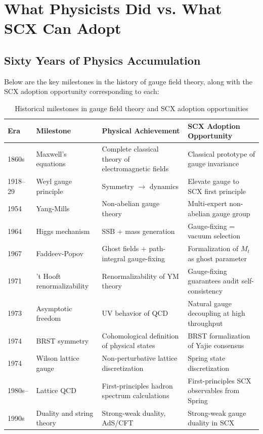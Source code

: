 \documentclass[12pt,a4paper]{article}
\theoremstyle{remark}
\begin{document}
\begin{longtable}{p{4.2cm} p{5cm} p{4cm} p{2cm}}
\bottomrule
\end{longtable}

\newpage

\section{What Physicists Did vs. What SCX Can Adopt}

\subsection{Sixty Years of Physics Accumulation}

Below are the key milestones in the history of gauge field theory, along with the SCX adoption opportunity corresponding to each:

\begin{table}[H]
\centering
\caption{Historical milestones in gauge field theory and SCX adoption opportunities}
\label{tab:milestones}
\small
\begin{tabular}{p{1.5cm} p{2.5cm} p{4cm} p{5cm}}
\toprule
\textbf{Era} & \textbf{Milestone} & \textbf{Physical Achievement} & \textbf{SCX Adoption Opportunity} \\
\midrule
1860s & Maxwell's equations & Complete classical theory of electromagnetic fields & Classical prototype of gauge invariance \\
1918--29 & Weyl gauge principle & Symmetry $\to$ dynamics & Elevate gauge to SCX first principle \\
1954 & Yang-Mills & Non-abelian gauge theory & Multi-expert non-abelian gauge group \\
1964 & Higgs mechanism & SSB + mass generation & Gauge-fixing = vacuum selection \\
1967 & Faddeev-Popov & Ghost fields + path-integral gauge-fixing & Formalization of $M_t$ as ghost parameter \\
1971 & 't Hooft renormalizability & Renormalizability of YM theory & Gauge-fixing guarantees audit self-consistency \\
1973 & Asymptotic freedom & UV behavior of QCD & Natural gauge decoupling at high throughput \\
1974 & BRST symmetry & Cohomological definition of physical states & BRST formalization of Yajie consensus \\
1974 & Wilson lattice gauge & Non-perturbative lattice discretization & Spring state discretization \\
1980s-- & Lattice QCD & First-principles hadron spectrum calculations & First-principles SCX observables from Spring \\
1990s & Duality and string theory & Strong-weak duality, AdS/CFT & Strong-weak gauge duality in SCX \\
\bottomrule
\end{tabular}
\end{table}
\end{document}
